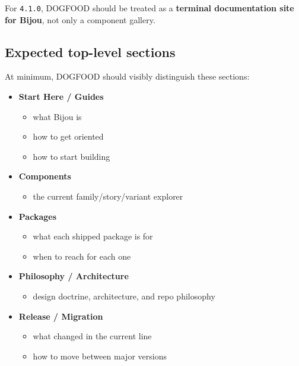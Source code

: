 For \texttt{4\allowbreak{}.\allowbreak{}1\allowbreak{}.\allowbreak{}0}, DOGFOOD should be treated as a \textbf{terminal documentation site for Bijou}, not only a component gallery.

\subsection{Expected top-level sections}\label{record-082-expected-top-level-sections}

At minimum, DOGFOOD should visibly distinguish these sections:

\begin{itemize}
\tightlist
\item
  \textbf{Start Here / Guides}

  \begin{itemize}
  \tightlist
  \item
    what Bijou is
  \item
    how to get oriented
  \item
    how to start building
  \end{itemize}
\item
  \textbf{Components}

  \begin{itemize}
  \tightlist
  \item
    the current family/story/variant explorer
  \end{itemize}
\item
  \textbf{Packages}

  \begin{itemize}
  \tightlist
  \item
    what each shipped package is for
  \item
    when to reach for each one
  \end{itemize}
\item
  \textbf{Philosophy / Architecture}

  \begin{itemize}
  \tightlist
  \item
    design doctrine, architecture, and repo philosophy
  \end{itemize}
\item
  \textbf{Release / Migration}

  \begin{itemize}
  \tightlist
  \item
    what changed in the current line
  \item
    how to move between major versions
  \end{itemize}
\end{itemize}


